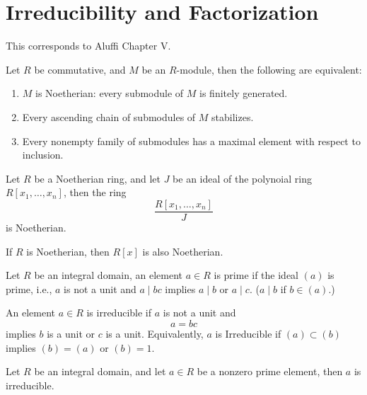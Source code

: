 \documentclass[openany]{book}
\begin{document}
\chapter{Irreducibility and Factorization}
This corresponds to Aluffi Chapter V.



\begin{prop}
    Let $R$ be commutative, and $M$ be an $R$-module, then the following are equivalent:
    \begin{enumerate}
        \item $M$ is Noetherian: every submodule of $M$ is finitely generated.
        \item Every ascending chain of submodules of $M$ stabilizes.
        \item Every nonempty family of submodules has a maximal element with respect to inclusion.
    \end{enumerate}
\end{prop}


\begin{prop}
    Let $R$ be a Noetherian ring, and let $J$ be an ideal of the polynoial ring $R[x_1,\dots, x_n]$, then the ring 
    \begin{equation*}
        \frac{R[x_1,\dots,x_n]}{J}
    \end{equation*}
    is Noetherian.
\end{prop}


\begin{prop}
    If $R$ is Noetherian, then $R[x]$ is also Noetherian.
\end{prop}
\begin{defn}
    Let $R$ be an integral domain, an element $a\in R$ is prime if the ideal $(a)$ is prime, i.e., $a$ is not a unit and $a\mid bc$ implies $a\mid b$ or $a\mid c$. ($a\mid b$ if $b\in(a)$.)

    An element $a\in R$ is irreducible if $a$ is not a unit and 
    \begin{equation*}
        a=bc
    \end{equation*}
    implies $b$ is a unit or $c$ is a unit. Equivalently, $a$ is Irreducible if $(a)\subset (b)$ implies $(b)=(a)$ or $(b)=1$.
\end{defn}

\begin{prop}
    Let $R$ be an integral domain, and let $a\in R$ be a nonzero prime element, then $a$ is irreducible.
\end{prop}
\end{document}
